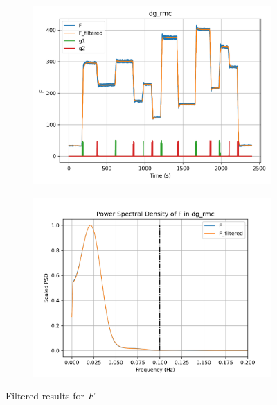 \begin{figure}[H]

\begin{minipage}{0.49\textwidth}
        \begin{figure}[H]
                \centering
                \includegraphics[width = \textwidth]{./figs/tst_filt/dg_rmc/F.png}
        \end{figure}
\end{minipage}
\begin{minipage}{0.49\textwidth}
        \begin{figure}[H]
                \centering
                \includegraphics[width = \textwidth]{./figs/tst_filt/dg_rmc/F_psd.png}
        \end{figure}
\end{minipage}
\caption{Filtered results for $F$}

\end{figure}


